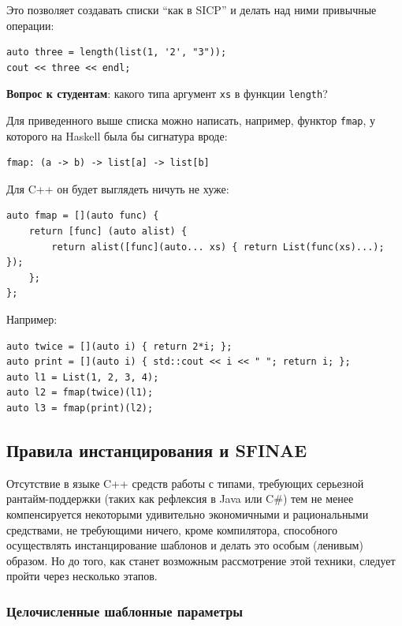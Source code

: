 \documentclass[a4paper,12pt,oneside]{article}
\newif\ifanswers
\begin{document}
Это позволяет создавать списки ``как в SICP'' и делать над ними привычные операции:

\begin{lstlisting}
auto three = length(list(1, '2', "3")); 
cout << three << endl;
\end{lstlisting}

\textbf{Вопрос к студентам}: какого типа аргумент \lstinline!xs! в функции \lstinline!length!?

\ifanswers
Правильный ответ: \lstinline!std::function!
\fi

Для приведенного выше списка можно написать, например, функтор \lstinline!fmap!, у которого на Haskell была бы сигнатура вроде:

\begin{verbatim}
fmap: (a -> b) -> list[a] -> list[b]
\end{verbatim}

Для C++ он будет выглядеть ничуть не хуже:

\begin{lstlisting}
auto fmap = [](auto func) {
    return [func] (auto alist) {
        return alist([func](auto... xs) { return List(func(xs)...); });
    };
};
\end{lstlisting}

Например:

\begin{lstlisting}
auto twice = [](auto i) { return 2*i; };
auto print = [](auto i) { std::cout << i << " "; return i; };
auto l1 = List(1, 2, 3, 4);
auto l2 = fmap(twice)(l1);
auto l3 = fmap(print)(l2);
\end{lstlisting}

\pagebreak
\subsection{Правила инстанцирования и SFINAE}\label{SFINAESection}

Отсутствие в языке C++ средств работы с типами, требующих серьезной рантайм-поддержки (таких как рефлексия в Java или C\#) тем не менее компенсируется некоторыми удивительно экономичными и рациональными средствами, не требующими ничего, кроме компилятора, способного осуществлять инстанцирование шаблонов и делать это особым (ленивым) образом. Но до того, как станет возможным рассмотрение этой техники, следует пройти через несколько этапов.

\subsubsection{Целочисленные шаблонные параметры}\label{IntegerTParam}
\end{document}
